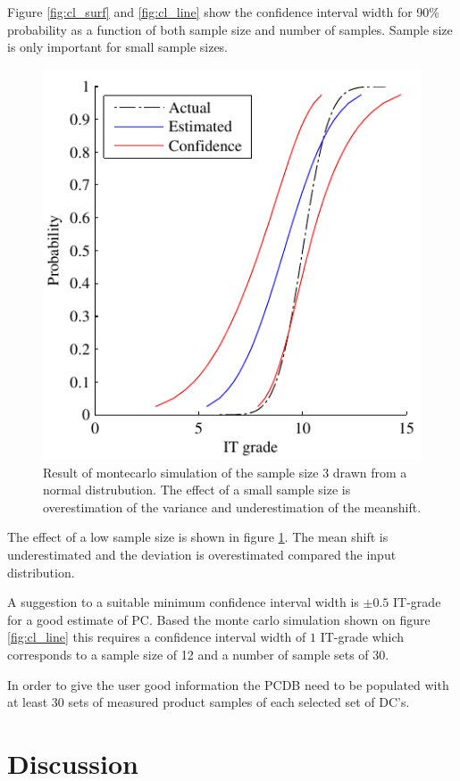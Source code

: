 \documentclass[aip,amsmath, reprint, author-year]{revtex4-1}
\begin{document}
Figure \ref{fig:cl_surf} and \ref{fig:cl_line} show the confidence interval width for 90\% probability as a function of both sample size and number of samples. Sample size is only important for small sample sizes. 

\begin{figure}
\includegraphics{effectoflowsamplesize.pdf}
\caption{\label{fig:effect} Result of montecarlo simulation of the sample size 3 drawn from a normal distrubution. The effect of a small sample size is overestimation of the variance and underestimation of the meanshift. }
\end{figure}

The effect of a low sample size is shown in figure \ref{fig:effect}. The mean shift is underestimated and the deviation is overestimated compared the input distribution.

A suggestion to a suitable minimum confidence interval width is $\pm 0.5$ IT-grade for a good estimate of PC.  Based the monte carlo simulation shown on figure \ref{fig:cl_line} this requires a confidence interval width of $1$ IT-grade which corresponds to a sample size of 12 and a number of sample sets of 30. 

In order to give the user good information the PCDB need to be populated with at least 30 sets of measured product samples of each selected set of DC's.

\section{Discussion}
\end{document}
